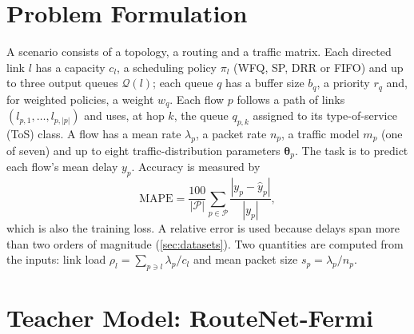 \section{Problem Formulation}
\label{sec:problem}

A scenario consists of a topology, a routing and a traffic matrix. Each directed link $l$ has a capacity $c_l$, a scheduling policy $\pi_l$ (WFQ, SP, DRR or FIFO) and up to three output queues $\mathcal{Q}(l)$; each queue $q$ has a buffer size $b_q$, a priority $r_q$ and, for weighted policies, a weight $w_q$. Each flow $p$ follows a path of links $(l_{p,1},\dots,l_{p,|p|})$ and uses, at hop $k$, the queue $q_{p,k}$ assigned to its type-of-service (ToS) class. A flow has a mean rate $\lambda_p$, a packet rate $n_p$, a traffic model $m_p$ (one of seven) and up to eight traffic-distribution parameters $\bm{\theta}_p$. The task is to predict each flow's mean delay $y_p$. Accuracy is measured by
\begin{equation}
\mathrm{MAPE} = \frac{100}{|\mathcal{P}|} \sum_{p \in \mathcal{P}} \frac{|y_p - \hat{y}_p|}{|y_p|},
\label{eq:mape}
\end{equation}
which is also the training loss. A relative error is used because delays span more than two orders of magnitude (\cref{sec:datasets}). Two quantities are computed from the inputs: link load $\rho_l = \sum_{p \ni l} \lambda_p / c_l$ and mean packet size $s_p = \lambda_p / n_p$.

\section{Teacher Model: RouteNet-Fermi}
\label{sec:teacher}

